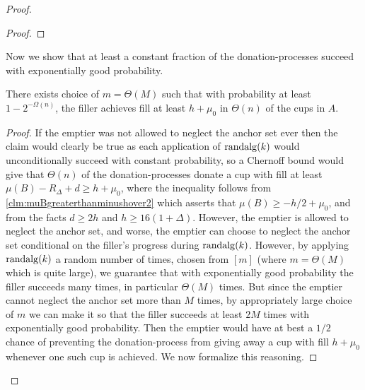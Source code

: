 \begin{proof}
\begin{proof}
\end{proof}

Now we show that at least a constant fraction of the
donation-processes succeed with exponentially good probability.
\begin{clm}
  \label{clm:baseChernoffBound}
  There exists choice of $m =\Theta(M)$ such that with
  probability at least $1-2^{-\Omega(n)}$, the filler achieves
  fill at least $h+\mu_0$ in $\Theta(n)$ of the cups in $A$. 
\end{clm}
\begin{proof}
  If the emptier was not allowed to neglect the anchor set ever
  then the claim would clearly be true as each application of
  $\operatorname{\text{\textup{randalg}}}(k)$ would unconditionally succeed with constant
  probability, so a Chernoff bound would give that $\Theta(n)$ of
  the donation-processes donate a cup with fill at least $\mu(B)
  - R_\Delta + d \ge h + \mu_0$, where the inequality follows
  from \cref{clm:muBgreaterthanminushover2} which asserts that
  $\mu(B) \ge -h/2 + \mu_0$, and from the facts $d\ge 2h$ and $h
  \ge 16(1+\Delta)$. However, the emptier is allowed to neglect
  the anchor set, and worse, the emptier can choose to neglect
  the anchor set conditional on the filler's progress during
  $\operatorname{\text{\textup{randalg}}}(k)$. However, by applying $\operatorname{\text{\textup{randalg}}}(k)$ a random
  number of times, chosen from $[m]$ (where $m=\Theta(M)$ which
  is quite large), we guarantee that with exponentially good
  probability the filler succeeds many times, in particular
  $\Theta(M)$ times. But since the emptier cannot neglect the
  anchor set more than $M$ times, by appropriately large choice
  of $m$ we can make it so that the filler succeeds at least $2M$
  times with exponentially good probability. Then the emptier
  would have at best a $1/2$ chance of preventing the
  donation-process from giving away a cup with fill $h+\mu_0$
  whenever one such cup is achieved. We now formalize this
  reasoning.


\end{proof}
\end{proof}
